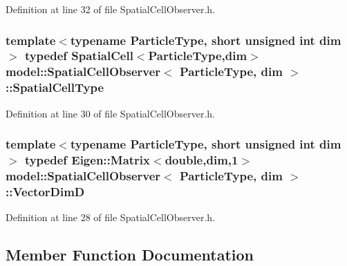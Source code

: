 Definition at line 32 of file Spatial\+Cell\+Observer.\+h.

\hypertarget{structmodel_1_1_spatial_cell_observer_a276f0ef902c63265b8236fb591d8a1f9}{}
\subsubsection[{Spatial\+Cell\+Type}]{\setlength{\rightskip}{0pt plus 5cm}template$<$typename Particle\+Type, short unsigned int dim$>$ typedef {\bf Spatial\+Cell}$<$Particle\+Type,{\bf dim}$>$ {\bf model\+::\+Spatial\+Cell\+Observer}$<$ Particle\+Type, {\bf dim} $>$\+::{\bf Spatial\+Cell\+Type}}\label{structmodel_1_1_spatial_cell_observer_a276f0ef902c63265b8236fb591d8a1f9}


Definition at line 30 of file Spatial\+Cell\+Observer.\+h.

\hypertarget{structmodel_1_1_spatial_cell_observer_a9b73220477f451fa7981e2597f23614b}{}
\subsubsection[{Vector\+Dim\+D}]{\setlength{\rightskip}{0pt plus 5cm}template$<$typename Particle\+Type, short unsigned int dim$>$ typedef Eigen\+::\+Matrix$<$double,{\bf dim},1$>$ {\bf model\+::\+Spatial\+Cell\+Observer}$<$ Particle\+Type, {\bf dim} $>$\+::{\bf Vector\+Dim\+D}}\label{structmodel_1_1_spatial_cell_observer_a9b73220477f451fa7981e2597f23614b}


Definition at line 28 of file Spatial\+Cell\+Observer.\+h.



\subsection{Member Function Documentation}
\hypertarget{structmodel_1_1_spatial_cell_observer_a040e9231e8149d96803c46279ed31d82}{}
